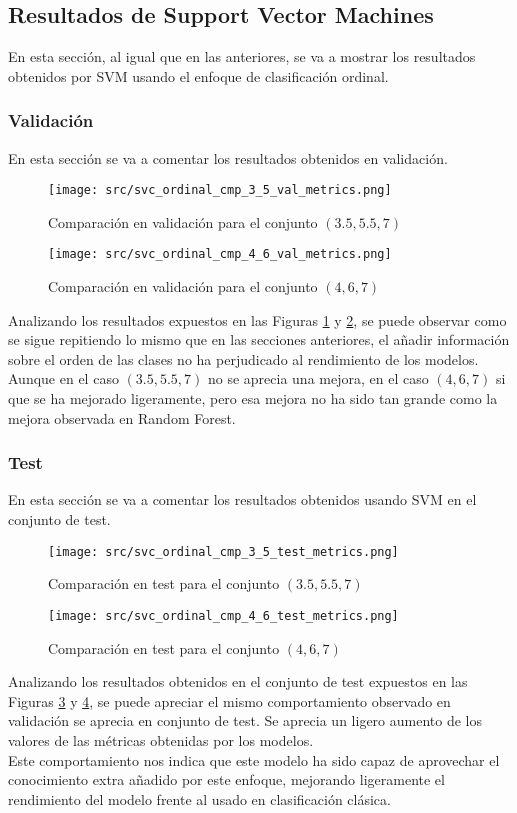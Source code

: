 \subsection{Resultados de Support Vector Machines}
\label{sec:ord_cmp_svm}
En esta sección, al igual que en las anteriores, se va a mostrar los resultados obtenidos por SVM usando el enfoque de clasificación ordinal.
\subsubsection*{Validación}
En esta sección se va a comentar los resultados obtenidos en validación.
\begin{figure}[H]
	\centering
	\texttt{[image: src/svc\_ordinal\_cmp\_3\_5\_val\_metrics.png]}
	\caption{Comparación en validación para el conjunto  $(3.5,5.5,7)$ }
	\label{fig:svc_ordin_val_cmp_1}
\end{figure}
\begin{figure}[H]
	\centering
	\texttt{[image: src/svc\_ordinal\_cmp\_4\_6\_val\_metrics.png]}
	\caption{Comparación en validación para el conjunto $(4,6,7)$}
	\label{fig:svc_ordin_val_cmp_2}
\end{figure}
Analizando los resultados expuestos en las Figuras \ref{fig:svc_ordin_val_cmp_1} y \ref{fig:svc_ordin_val_cmp_2}, se puede observar como se sigue repitiendo lo mismo que en las secciones anteriores, el añadir información sobre el orden de las clases no ha perjudicado al rendimiento de los modelos.\\
Aunque en el caso $(3.5,5.5,7)$ no se aprecia una mejora, en el caso $(4,6,7)$ si que se ha mejorado ligeramente, pero esa mejora no ha sido tan grande como la mejora observada en Random Forest.
\clearpage
\subsubsection*{Test}
En esta sección se va a comentar los resultados obtenidos usando SVM en el conjunto de test.
\begin{figure}[H]
	\centering
	\texttt{[image: src/svc\_ordinal\_cmp\_3\_5\_test\_metrics.png]}
	\caption{Comparación en test para el conjunto  $(3.5,5.5,7)$}
	\label{fig:svc_ordin_test_cmp_1}
\end{figure}
\begin{figure}[H]
	\centering
	\texttt{[image: src/svc\_ordinal\_cmp\_4\_6\_test\_metrics.png]}
	\caption{Comparación en test para el conjunto  $(4,6,7)$}
	\label{fig:svc_ordin_test_cmp_2}
\end{figure}
Analizando los resultados obtenidos en el conjunto de test expuestos en las Figuras \ref{fig:svc_ordin_test_cmp_1} y \ref{fig:svc_ordin_test_cmp_2}, se puede apreciar el mismo comportamiento observado en validación se aprecia en conjunto de test. Se aprecia un ligero aumento de los valores de las métricas obtenidas por los modelos.\\
Este comportamiento nos indica que este modelo ha sido capaz de aprovechar el conocimiento extra añadido por este enfoque, mejorando ligeramente el rendimiento del modelo frente al usado en clasificación clásica.
\clearpage
